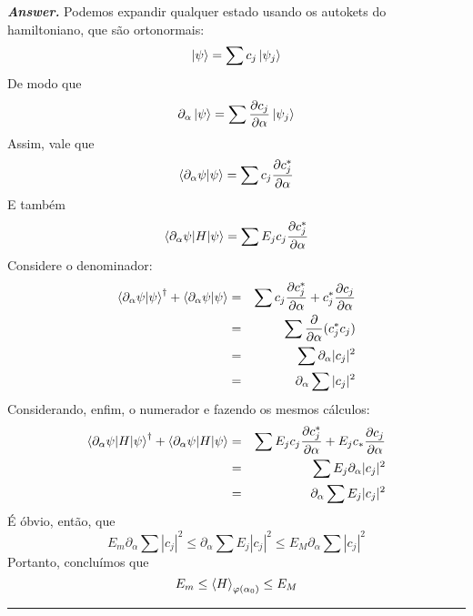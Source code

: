 \documentclass[12pt]{article}
\def\be{\begin{equation}}
\def\ee{\end{equation}}
\def\bea{\begin{eqnarray*}}
\def\eea{\end{eqnarray*}}
\def\f{\frac}
\newenvironment{answer}{\noindent\textbf{\textit{Answer.}} \normalfont }{\par\noindent\rule{\textwidth}{0.4pt}}
\begin{document}
\begin{answer}
		Podemos expandir qualquer estado usando os autokets do hamiltoniano, que são ortonormais:
		\be
			\ket{\psi} = \sum c_j\ket{\psi_j}
		\ee
		De modo que
		\be
			\partial_\alpha\ket{\psi} = \sum \f{\partial c_j}{\partial\alpha} \ket{\psi_j}
		\ee
		Assim, vale que
		\be
			\braket{\partial_\alpha\psi|\psi} = \sum c_j\f{\partial c_j^*}{\partial\alpha}
		\ee
		E também
		\be
			\braket{\partial_\alpha\psi|H|\psi} = \sum E_jc_j\f{\partial c_j^*}{\partial\alpha}
		\ee
		Considere o denominador:
		\bea
			\braket{\partial_\alpha\psi|\psi}^\dagger + \braket{\partial_\alpha\psi|\psi} 
				&=& \sum c_j \f{\partial c_j^*}{\partial\alpha} + c_j^*\f{\partial c_j}{\partial\alpha} \\
				&=& \sum \f{\partial}{\partial\alpha} (c_j^*c_j) \\
				&=& \sum \partial_\alpha |c_j|^2 \\
				&=& \partial_\alpha \sum |c_j|^2
		\eea
		Considerando, enfim, o numerador e fazendo os mesmos cálculos:
		\bea
			\braket{\partial_\alpha\psi|H|\psi}^\dagger + \braket{\partial_\alpha\psi|H|\psi} 
				&=& \sum E_jc_j\f{\partial c_j^*}{\partial\alpha} + E_j c_* \f{\partial c_j}{\partial\alpha} \\
				&=& \sum E_j \partial_\alpha |c_j|^2 \\
				&=& \partial_\alpha \sum E_j|c_j|^2 
		\eea
		É óbvio, então, que
		\be
			E_m \partial_\alpha\sum |c_j|^2 \leq \partial_\alpha\sum E_j|c_j|^2 \leq E_M \partial_\alpha\sum |c_j|^2
		\ee 
		Portanto, concluímos que
		\be
			E_m \leq \braket{H}_{\varphi(\alpha_0)} \leq E_M
		\ee
		
	\end{answer}
\end{document}
